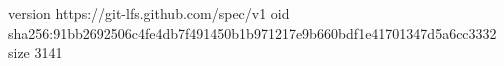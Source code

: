 version https://git-lfs.github.com/spec/v1
oid sha256:91bb2692506c4fe4db7f491450b1b971217e9b660bdf1e41701347d5a6cc3332
size 3141
